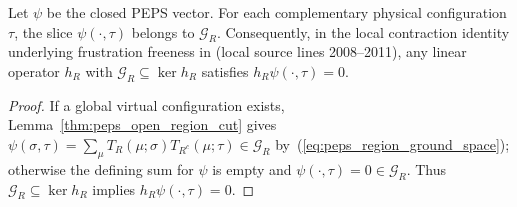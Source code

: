 \begin{lemma}%
    \label{thm:peps_region_ground_space_slice}
    \leanok
    Let $\psi$ be the closed PEPS vector. For each complementary physical
    configuration $\tau$, the slice $\psi(\cdot,\tau)$ belongs to
    $\mathcal G_R$. Consequently, in the local contraction identity underlying
    frustration freeness in \cite[Section~IV.C.1]{Cirac2021Matrix} (local
    source lines 2008--2011), any linear operator $h_R$ with
    $\mathcal G_R\subseteq\ker h_R$ satisfies $h_R\psi(\cdot,\tau)=0$.
\end{lemma}

\begin{proof}\leanok
    If a global virtual configuration exists, Lemma~\ref{thm:peps_open_region_cut}
    gives $\psi(\sigma,\tau)=\sum_\mu T_R(\mu;\sigma)T_{R^c}(\mu;\tau)\in\mathcal G_R$
    by~(\ref{eq:peps_region_ground_space}); otherwise the defining sum for
    $\psi$ is empty and $\psi(\cdot,\tau)=0\in\mathcal G_R$. Thus
    $\mathcal G_R\subseteq\ker h_R$ implies $h_R\psi(\cdot,\tau)=0$.
\end{proof}
